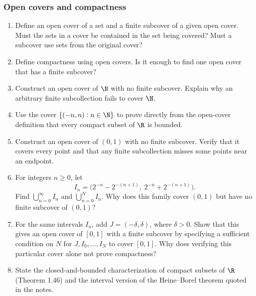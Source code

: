 \subsubsection*{Open covers and compactness}
\begin{enumerate}[resume]
  \item Define an open cover of a set and a finite subcover of a given
    open cover. Must the sets in a cover be contained in the set being
    covered? Must a subcover use sets from the original cover?

  \item Define compactness using open covers. Is it enough to find
    one open cover that has a finite subcover?

  \item Construct an open cover of \(\N\) with no finite subcover.
    Explain why an arbitrary finite subcollection fails to cover \(\N\).

  \item Use the cover \(\{(-n,n):n\in\N\}\) to prove directly from
    the open-cover definition that every compact subset of \(\R\)
    is bounded.

  \item Construct an open cover of \((0,1)\) with no finite subcover.
    Verify that it covers every point and that any finite subcollection
    misses some points near an endpoint.

  \item For integers \(n\geq0\), let
    \[
      I_n=\bigl(2^{-n}-2^{-(n+1)},\;2^{-n}+2^{-(n+1)}\bigr).
    \]
    Find \(\bigcup_{n=0}^{\infty}I_n\) and
    \(\bigcup_{n=0}^{N}I_n\). Why does this family cover \((0,1)\)
    but have no finite subcover of \((0,1)\)?

  \item For the same intervals \(I_n\), add \(J=(-\delta,\delta)\),
    where \(\delta>0\). Show that this gives an open cover of \([0,1]\)
    with a finite subcover by specifying a sufficient condition on \(N\)
    for \(J,I_0,\ldots,I_N\) to cover \([0,1]\).
    Why does verifying this particular cover alone not prove compactness?

  \item State the closed-and-bounded characterization of compact subsets
    of \(\R\) (Theorem 1.46) and the interval version of the Heine--Borel
    theorem quoted in the notes.


\end{enumerate}
